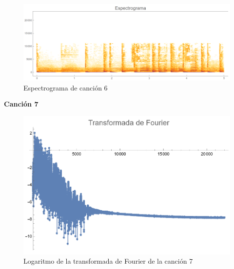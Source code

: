 \documentclass[12pt, letterpaper]{article}
\begin{document}
\begin{figure}[H]
  \centering
  \includegraphics[width=.9\linewidth]{imgs/Cancion6/espectrograma.png}
  \caption{Espectrograma de canción 6}
  \label{fig:06i}
\end{figure}

\textbf{\large{Canción 7}}
\begin{figure}[H]
  \centering
  \includegraphics[width=0.7\linewidth]{imgs/Cancion7/transformada.png}
  \caption{Logaritmo de la transformada de Fourier de la canción 7}
  \label{fig:07a}
\end{figure}
\end{document}
